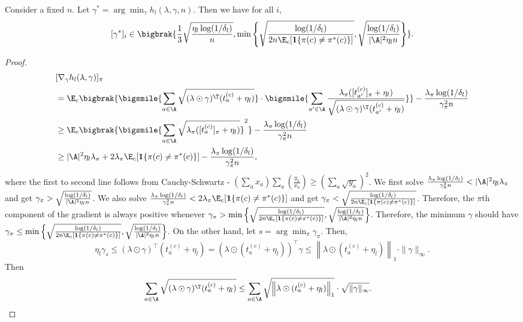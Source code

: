 \documentclass{article}
\newcommand{\1}{\mathbf{1}}
\begin{document}
\begin{lemma}
Consider a fixed $n$. Let $\gamma^*=\arg\min_{\gamma}h_l(\lambda,\gamma,n)$. Then we have for all $i$, \[[\gamma^*]_i\in\bigbrak{\frac{1}{3}\sqrt{\frac{\eta_l\log(1/\delta_l)}{n}},\min\left\{\sqrt{\frac{\log(1/\delta_l)}{2n\E_c[\1\{\pi(c)\ne\pi^*(c)\}]}},\sqrt{\frac{\log(1/\delta_l)}{|\A|^2\eta_l n}}\right\}}.\]
\end{lemma}
\begin{proof}
\begin{align*}
    &[\nabla_\gamma h_l(\lambda,\gamma)]_\pi\\
    &=\E_c\bigbrak{\bigsmile{\sum_{a\in\A}\sqrt{(\lambda\odot\gamma)^\T (t_a^{(c)}+\eta_l)}}\cdot\bigsmile{\sum_{a'\in\A}\frac{\lambda_\pi([t_{a'}^{(c)}]_\pi+\eta_l)}{\sqrt{(\lambda\odot\gamma)^\T (t_{a'}^{(c)}+\eta_l)}}}}-\frac{\lambda_\pi\log(1/\delta_l)}{\gamma_\pi^2 n}\\
    &\geq \E_c\bigbrak{\bigsmile{\sum_{a\in\A}\sqrt{\lambda_\pi([t_{a}^{(c)}]_\pi+\eta_l)}}^2}-\frac{\lambda_\pi\log(1/\delta_l)}{\gamma_\pi^2 n}\\
    &\geq |\A|^2\eta_l\lambda_\pi+2\lambda_\pi\E_c[\1\{\pi(c)\ne\pi^*(c)\}]-\frac{\lambda_\pi\log(1/\delta_l)}{\gamma_\pi^2 n},
\end{align*}
where the first to second line follows from Cauchy-Schwartz - $(\sum_{a} x_a)\sum_{a} \left(\tfrac{y_a}{x_a}\right) \geq (\sum_a \sqrt{y_a})^2$.
We first solve $\frac{\lambda_\pi\log(1/\delta_l)}{\gamma_\pi^2 n}<|\A|^2\eta_l\lambda_\pi$ and get $\gamma_\pi>\sqrt{\frac{\log(1/\delta_l)}{|\A|^2\eta_l n}}$. We also solve $\frac{\lambda_\pi\log(1/\delta_l)}{\gamma_\pi^2 n}<2\lambda_\pi\E_c[\1\{\pi(c)\ne\pi^*(c)\}]$ and get $\gamma_\pi<\sqrt{\frac{\log(1/\delta_l)}{2n\E_c[\1\{\pi(c)\ne\pi^*(c)\}]}}$. 
Therefore, the $\pi$th component of the gradient is always positive whenever $\gamma_\pi>\min\left\{\sqrt{\frac{\log(1/\delta_l)}{2n\E_c[\1\{\pi(c)\ne\pi^*(c)\}]}},\sqrt{\frac{\log(1/\delta_l)}{|\A|^2\eta_l n}}\right\}$. 
Therefore, the minimum $\gamma$ should have $\gamma_\pi\leq \min\left\{\sqrt{\frac{\log(1/\delta_l)}{2n\E_c[\1\{\pi(c)\ne\pi^*(c)\}]}},\sqrt{\frac{\log(1/\delta_l)}{|\A|^2\eta_l n}}\right\}$. 
On the other hand, let $s=\arg\min_{\pi}\gamma_\pi$. 
Then, \[\eta_l\gamma_{s} \leq (\lambda \odot \gamma)^{\top} (t_{a}^{(c)}+\eta_l)=\left(\lambda \odot (t_{a}^{(c)}+\eta_l)\right)^{\top} \gamma \leq\left\|\lambda \odot (t_{a}^{(c)}+\eta_l)\right\|_{1} \cdot\|\gamma\|_{\infty}.\] 
Then 
\begin{align*}
    \sum_{a\in\A}\sqrt{(\lambda\odot\gamma)^\T (t_a^{(c)}+\eta_l)}&\leq \sum_{a\in\A}\sqrt{\left\|\lambda \odot (t_{a}^{(c)}+\eta_l)\right\|_{1}} \cdot\sqrt{\|\gamma\|_{\infty}}.

\end{align*}
\end{proof}
\end{document}
